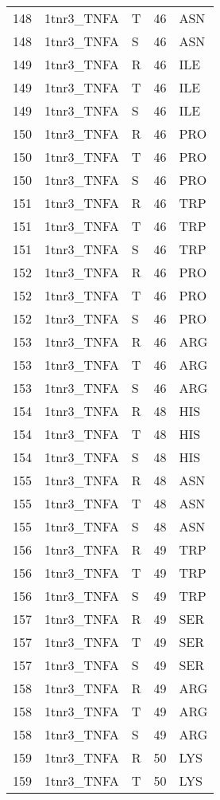 \begin{tiny}
\begin{longtable}[l]{l|l|l|l|l}
	148 & 1tnr3\_TNFA & T & 46 & ASN \\
	148 & 1tnr3\_TNFA & S & 46 & ASN \\
	149 & 1tnr3\_TNFA & R & 46 & ILE \\
	149 & 1tnr3\_TNFA & T & 46 & ILE \\
	149 & 1tnr3\_TNFA & S & 46 & ILE \\
	150 & 1tnr3\_TNFA & R & 46 & PRO \\
	150 & 1tnr3\_TNFA & T & 46 & PRO \\
	150 & 1tnr3\_TNFA & S & 46 & PRO \\
	151 & 1tnr3\_TNFA & R & 46 & TRP \\
	151 & 1tnr3\_TNFA & T & 46 & TRP \\
	151 & 1tnr3\_TNFA & S & 46 & TRP \\
	152 & 1tnr3\_TNFA & R & 46 & PRO \\
	152 & 1tnr3\_TNFA & T & 46 & PRO \\
	152 & 1tnr3\_TNFA & S & 46 & PRO \\
	153 & 1tnr3\_TNFA & R & 46 & ARG \\
	153 & 1tnr3\_TNFA & T & 46 & ARG \\
	153 & 1tnr3\_TNFA & S & 46 & ARG \\
	154 & 1tnr3\_TNFA & R & 48 & HIS \\
	154 & 1tnr3\_TNFA & T & 48 & HIS \\
	154 & 1tnr3\_TNFA & S & 48 & HIS \\
	155 & 1tnr3\_TNFA & R & 48 & ASN \\
	155 & 1tnr3\_TNFA & T & 48 & ASN \\
	155 & 1tnr3\_TNFA & S & 48 & ASN \\
	156 & 1tnr3\_TNFA & R & 49 & TRP \\
	156 & 1tnr3\_TNFA & T & 49 & TRP \\
	156 & 1tnr3\_TNFA & S & 49 & TRP \\
	157 & 1tnr3\_TNFA & R & 49 & SER \\
	157 & 1tnr3\_TNFA & T & 49 & SER \\
	157 & 1tnr3\_TNFA & S & 49 & SER \\
	158 & 1tnr3\_TNFA & R & 49 & ARG \\
	158 & 1tnr3\_TNFA & T & 49 & ARG \\
	158 & 1tnr3\_TNFA & S & 49 & ARG \\
	159 & 1tnr3\_TNFA & R & 50 & LYS \\
	159 & 1tnr3\_TNFA & T & 50 & LYS \\

\end{longtable}
\end{tiny}
